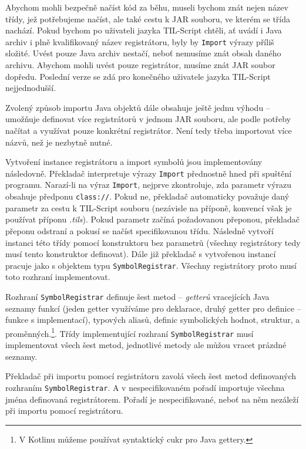 Abychom mohli bezpečně načíst kód za běhu, museli bychom znát nejen název třídy, jež potřebujeme
načíst, ale také cestu k JAR souboru, ve kterém se třída nachází. Pokud bychom po uživateli jazyka
TIL-Script chtěli, ať uvádí i Java archiv i plně kvalifikovaný název registrátoru, byly by
\lstinline{Import} výrazy příliš složité. Uvést pouze Java archiv nestačí, neboť nemusíme znát obsah
daného archivu. Abychom mohli uvést pouze registrátor, musíme znát JAR soubor dopředu. Poslední
verze se zdá pro konečného uživatele jazyka TIL-Script nejjednodušší.

Zvolený způsob importu Java objektů dále obsahuje ještě jednu výhodu -- umožňuje definovat více
registrátorů v jednom JAR souboru, ale podle potřeby načítat a využívat pouze konkrétní registrátor.
Není tedy třeba importovat více názvů, než je nezbytně nutné.

Vytvoření instance registrátoru a import symbolů jsou implementovány následovně. Překladač
interpretuje výrazy \lstinline{Import} přednostně hned při spuštění programu. Narazí-li na výraz
\lstinline{Import}, nejprve zkontroluje, zda parametr výrazu obsahuje předponu \lstinline{class://}.
Pokud ne, překladač automaticky považuje daný parametr za cestu k TIL-Script souboru (nezávisle
na příponě, konvencí však je používat příponu \textit{.tils}). Pokud parametr začíná požadovanou
přeponou, překladač přeponu odstraní a pokusí se načíst specifikovanou třídu. Následně vytvoří
instanci této třídy pomocí konstruktoru bez parametrů (všechny registrátory tedy musí tento
konstruktor definovat). Dále již překladač s vytvořenou instancí pracuje jako s objektem typu
\lstinline{SymbolRegistrar}. Všechny registrátory proto musí toto rozhraní implementovat.

Rozhraní \lstinline{SymbolRegistrar} definuje šest metod -- \textit{getterů} vracejících Java
seznamy funkcí (jeden getter využíváme pro deklarace, druhý getter pro definice -- funkce
s implementací), typových aliasů, definic symbolických hodnot, struktur, a proměnných.\footnote{
  V Kotlinu můžeme používat syntaktický cukr pro Java gettery.}.
Třídy implementující rozhraní \lstinline{SymbolRegistrar} musí implementovat všech šest metod,
jednotlivé metody ale můžou vracet prázdné seznamy.

Překladač při importu pomocí registrátoru zavolá všech šest metod definovaných rozhraním
\lstinline{SymbolRegistrar}. A v nespecifikovaném pořadí importuje všechna jména definovaná
registrátorem. Pořadí je nespecifikované, neboť na něm nezáleží při importu pomocí registrátoru.

